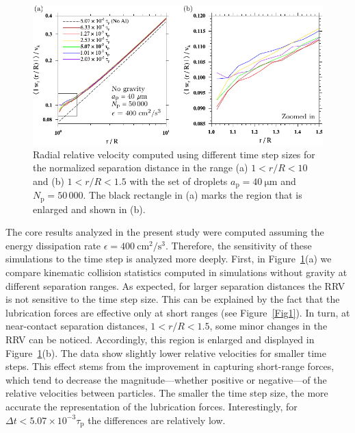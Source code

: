 \documentclass[../thesis.tex]{subfiles}
\begin{document}
\begin{figure}%
\center
\includegraphics[width=\textwidth]{../figs/JFM/fig3.pdf}
\caption{Radial relative velocity computed using different time step sizes
for the normalized separation distance in the range (a) $1 < r/R < 10$ and (b) $1 < r/R < 1.5$
 with the set of droplets $a_\mathrm{p} = 40~\mathrm{\mu m}$ and $N_\mathrm{p} = 50\,000$.
The black rectangle in (a) marks the region that is enlarged and shown in (b).}
\label{Fig3}
\end{figure}%

The core results analyzed in the present study were computed assuming the energy dissipation rate $\epsilon = 400~\mathrm{cm^2/s^3}$. Therefore, the sensitivity of these simulations to the time step is analyzed more deeply. First, in Figure~\ref{Fig3}(a) we compare kinematic collision statistics computed in simulations without gravity at different separation ranges. As expected, for larger separation distances the RRV is not sensitive to the time step size. This can be explained by the fact that the lubrication forces are effective only at short ranges (see Figure~\ref{Fig1}). In turn, at near-contact separation distances, $1<r/R<1.5$, some minor changes in the RRV can be noticed. Accordingly, this region is enlarged and displayed in Figure~\ref{Fig3}(b). The data show slightly lower relative velocities for smaller time steps. This effect stems from the improvement in capturing short-range forces, which tend to decrease the magnitude---whether positive or negative---of the relative velocities between particles. The smaller the time step size, the more accurate the representation of the lubrication forces. Interestingly, for $\Delta t < 5.07 \times 10^{-3} \tau_\text{p}$ the differences are relatively low.
\end{document}

